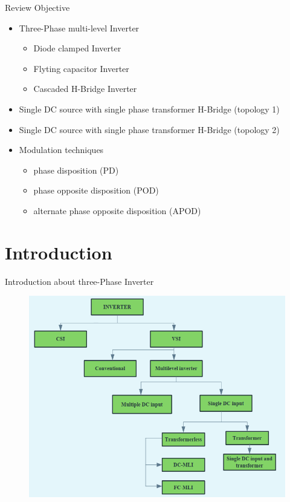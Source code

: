 \documentclass[
	11pt, %
]{beamer}
\begin{document}
\begin{frame}{Review Objective}
	\begin{itemize}
		\footnotesize
		\item {Three-Phase multi-level Inverter}
		\begin{itemize}
			\item{Diode clamped Inverter}
			\item{Flyting capacitor Inverter}
			\item{Cascaded H-Bridge Inverter}
		\end{itemize}
		\item{Single DC source with single phase transformer H-Bridge (topology 1)}
		\item{Single DC source with single phase transformer H-Bridge (topology 2)}
		\item{Modulation techniques}
		\begin{itemize}
			\item {phase disposition (PD)}
			\item {phase opposite disposition (POD)}
			\item {alternate phase opposite disposition (APOD)}
		\end{itemize}
	\end{itemize}
\end{frame}



\section{Introduction}
\begin{frame}{Introduction about three-Phase Inverter}
	\begin{figure}
		\includegraphics[width=0.7\linewidth]{introthreephaseinverter.png}
	\end{figure}
\end{frame}
\end{document}
